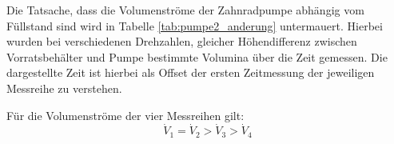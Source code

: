 Die Tatsache, dass die Volumenströme der Zahnradpumpe abhängig vom Füllstand sind wird in Tabelle \ref{tab:pumpe2_anderung} untermauert. Hierbei wurden bei verschiedenen Drehzahlen, gleicher Höhendifferenz zwischen Vorratsbehälter und Pumpe bestimmte Volumina über die Zeit gemessen. Die dargestellte Zeit ist hierbei als Offset der ersten Zeitmessung der jeweiligen Messreihe zu verstehen. 

\begin{table}[h!]
	\renewcommand*{\arraystretch}{1.2}
	\centering
	\caption{Volumenströme der Zahnradpumpe in Abhängigkeit von der Zeit}
	\label{tab:pumpe2_anderung}
\end{table}%
\FloatBarrier

Für die Volumenströme der vier Messreihen gilt:
\begin{equation*}
	\dot{V}_1 = \dot{V}_2 > \dot{V}_3 > \dot{V}_4
\end{equation*}

